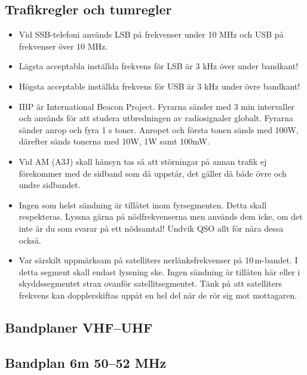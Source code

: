 \subsection{Trafikregler och tumregler}

\begin{itemize}
\item Vid SSB-telefoni används LSB på frekvenser under 10 MHz och USB
      på frekvenser över 10 MHz.
\item Lägsta acceptabla inställda frekvens för LSB är 3 kHz över
      under bandkant!
\item Högsta acceptable inställda frekvens för USB är 3 kHz under
      övre bandkant!
\item IBP är International Beacon Project. Fyrarna sänder med 3 min
      intervaller och används för att studera utbredningen av
      radiosignaler globalt. Fyrarna sänder anrop och fyra 1 s toner.
      Anropet och första tonen sänds med 100W, därefter sänds tonerna
      med 10W, 1W samt 100mW.
\item Vid AM (A3J) skall hänsyn tas så att störningar på annan trafik ej fö\-re\-kom\-mer
      med de sidband som då uppstår, det gäller då både övre och undre
      sidbandet.
\item Ingen som helst sändning är tillåtet inom fyrsegmenten. Detta skall respekteras.
      Lyssna gärna på nödfrekvenserna men används dem icke, om det
      inte är du som svarar på ett nödsamtal! Undvik QSO allt för nära
      dessa också.
\item Var särskilt uppmärksam på satelliters nerlänksfrekvenser på 10\,m-bandet.
      I detta segment skall endast lyssning ske. Ingen sändning är
      tillåten här eller i skyddssegmentet strax ovanför
      satellitsegmentet. Tänk på att satelliters frekvens kan
      dopplerskiftas uppåt en hel del när de rör sig mot mottagaren.
\end{itemize}

\small
\subsection{Bandplaner VHF--UHF}

\subsection{Bandplan 6m 50--52 MHz}

